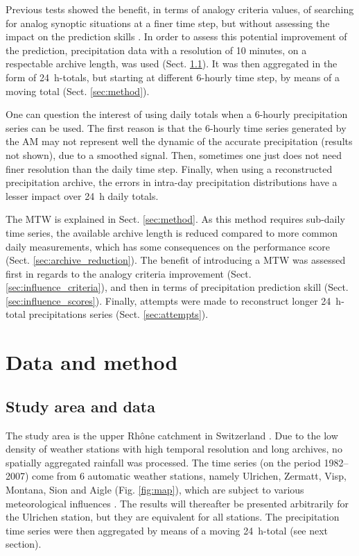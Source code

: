 \documentclass[hess, manuscript]{copernicus}
\begin{document}
Previous tests showed the benefit, in terms of analogy criteria values, of searching for analog synoptic situations at a finer time step, but without assessing the impact on the prediction skills \citep{Finet2008}. In order to assess this potential improvement of the prediction, precipitation data with a resolution of 10 minutes, on a respectable archive length, was used (Sect. \ref{sec:data}). It was then aggregated in the form of 24~h-totals, but starting at different 6-hourly time step, by means of a moving total (Sect. \ref{sec:method}). 

One can question the interest of using daily totals when a 6-hourly precipitation series can be used. The first reason is that the 6-hourly time series generated by the AM may not represent well the dynamic of the accurate precipitation (results not shown), due to a smoothed signal. Then, sometimes one just does not need finer resolution than the daily time step. Finally, when using a reconstructed precipitation archive, the errors in intra-day precipitation distributions have a lesser impact over 24~h daily totals.

The MTW is explained in Sect. \ref{sec:method}. As this method requires sub-daily time series, the available archive length is reduced compared to more common daily measurements, which has some consequences on the performance score (Sect. \ref{sec:archive_reduction}). The benefit of introducing a MTW was assessed first in regards to the analogy criteria improvement (Sect. \ref{sec:influence_criteria}), and then in terms of precipitation prediction skill (Sect. \ref{sec:influence_scores}). Finally, attempts were made to reconstruct longer 24~h-total precipitations series (Sect. \ref{sec:attempts}).


\section{Data and method}

\subsection{Study area and data}
\label{sec:data}

The study area is the upper Rh\^{o}ne catchment in Switzerland \cite[see also][]{Horton2012a}. Due to the low density of weather stations with high temporal resolution and long archives, no spatially aggregated rainfall was processed. The time series (on the period 1982--2007) come from 6 automatic weather stations, namely Ulrichen, Zermatt, Visp, Montana, Sion and Aigle (Fig. \ref{fig:map}), which are subject to various meteorological influences \citep{Horton2012}. The results will thereafter be presented arbitrarily for the Ulrichen station, but they are equivalent for all stations. The precipitation time series were then aggregated by means of a moving 24~h-total (see next section).
\end{document}
